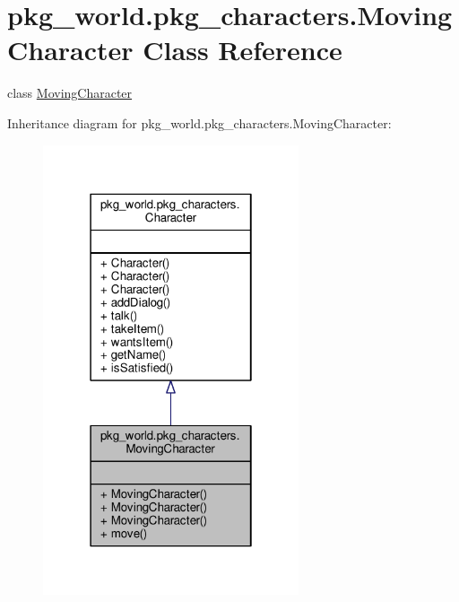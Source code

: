 \hypertarget{classpkg__world_1_1pkg__characters_1_1MovingCharacter}{\section{pkg\-\_\-world.\-pkg\-\_\-characters.\-Moving\-Character Class Reference}
\label{classpkg__world_1_1pkg__characters_1_1MovingCharacter}
}


class \hyperlink{classpkg__world_1_1pkg__characters_1_1MovingCharacter}{Moving\-Character}  




Inheritance diagram for pkg\-\_\-world.\-pkg\-\_\-characters.\-Moving\-Character\-:
\nopagebreak
\begin{figure}[H]
\begin{center}
\leavevmode
\includegraphics[width=214pt]{classpkg__world_1_1pkg__characters_1_1MovingCharacter__inherit__graph}
\end{center}
\end{figure}


